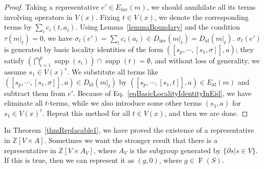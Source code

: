 \documentclass[reprint, amsmath, amssymb, showpacs, floatfix, longbibliography, aps, twocolumn, superscriptaddress, nofootinbib]{revtex4-2}
\newcommand{\ZZ}{{\mathbb Z}}
\newcommand{\supp}{\operatorname{supp}}
\theoremstyle{definition}
\begin{document}
\begin{proof}
	Taking a representative $e'\in E_{\operatorname{inv}}(m)$, we should annihilate all its terms involving operators in $V(x)$. Fixing $t\in V(x)$, we denote the corresponding terms by $\sum_ic_i(t,a_i)$. Using Lemma~\ref{lemmaBoundary} and the condition $\tau(m|_t)=0$, we have $\sigma_t(e')=\sum_ic_i(a_i)\in D_{\operatorname{inv}}(m|_t)=D_{\operatorname{id}}(m|_t)$. $\sigma_t(e')$ is generated by basic locality identities of the form $([s_p,\cdots,[s_1,\sigma]],a)$; they satisfy $(\bigcap_{i=1}^p \supp(s_i))\cap\supp(t)=\emptyset$, and without loss of generality, we assume $s_1\in V(x)^c$. 
	We substitute all terms like $([s_p,\cdots,[s_1,\sigma]],a)\in D_{\operatorname{id}}(m|_t)$ by $([s_p,\cdots,[s_1,t]],a)\in E_{\operatorname{id}}(m)$ and subtract them from $e'$. Because of Eq.~\eqref{eqBasicLocalityIdentityInEid}, we have eliminate all $t$-terms, while we also introduce some other terms $(s_1,a)$ for $s_1\in V(x)^c$. Repeat this method for all $t\in V(x)$, and then we are done.
\end{proof}


In Theorem~\ref{thmReplacable1}, we have proved the existence of a representative in $\ZZ[V\times A]$. Sometimes we want the stronger result that there is a representative in $\ZZ[V\times A_V]$, where $A_V$ is the subgroup generated by $\{\partial s|s\in V\}$. If this is true, then we can represent it as $(g,0)$, where $g\in\operatorname{F}(S)$.
\end{document}
